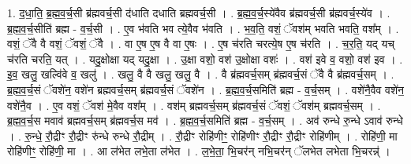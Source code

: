 \documentclass[17pt]{extarticle}
\begin{document}
1. द॒धा॒ति॒ ब्र॒ह्म॒व॒र्च॒सी ब्र॑ह्मवर्च॒सी द॑धाति दधाति ब्रह्मवर्च॒सी । . ब्र॒ह्म॒व॒र्च॒स्ये॑वैव ब्र॑ह्मवर्च॒सी ब्र॑ह्मवर्च॒स्ये॑व । . ब्र॒ह्म॒व॒र्च॒सीति॑ ब्रह्म - व॒र्च॒सी । . ए॒व भ॑वति भव त्ये॒वैव भ॑वति । . भ॒व॒ति॒ वशं॒ ॅवश॑म् भवति भवति॒ वश᳚म् । . वशं॒ ॅवै वै वशं॒ ॅवशं॒ ॅवै । . वा ए॒ष ए॒ष वै वा ए॒षः । . ए॒ष च॑रति चरत्ये॒ष ए॒ष च॑रति । . च॒र॒ति॒ यद् यच् च॑रति चरति॒ यत् । . यदु॒क्षोक्षा यद् यदु॒क्षा । . उ॒क्षा वशो॒ वश॑ उ॒क्षोक्षा वशः॑ । . वश॑ इवे व॒ वशो॒ वश॑ इव । . इ॒व॒ खलु॒ खल्वि॑वे व॒ खलु॑ । . खलु॒ वै वै खलु॒ खलु॒ वै । . वै ब्र॑ह्मवर्च॒सम् ब्र॑ह्मवर्च॒सं ॅवै वै ब्र॑ह्मवर्च॒सम् । . ब्र॒ह्म॒व॒र्च॒सं ॅवशे॑न॒ वशे॑न ब्रह्मवर्च॒सम् ब्र॑ह्मवर्च॒सं ॅवशे॑न । . ब्र॒ह्म॒व॒र्च॒समिति॑ ब्रह्म - व॒र्च॒सम् । . वशे॑नै॒वैव वशे॑न॒ वशे॑नै॒व । . ए॒व वशं॒ ॅवश॑ मे॒वैव वश᳚म् । . वश॑म् ब्रह्मवर्च॒सम् ब्र॑ह्मवर्च॒सं ॅवशं॒ ॅवश॑म् ब्रह्मवर्च॒सम् । . ब्र॒ह्म॒व॒र्च॒स मवाव॑ ब्रह्मवर्च॒सम् ब्र॑ह्मवर्च॒स मव॑ । . ब्र॒ह्म॒व॒र्च॒समिति॑ ब्रह्म - व॒र्च॒सम् । . अव॑ रुन्धे रु॒न्धे ऽवाव॑ रुन्धे । . रु॒न्धे॒ रौ॒द्रीꣳ रौ॒द्रीꣳ रु॑न्धे रुन्धे रौ॒द्रीम् । . रौ॒द्रीꣳ रोहि॑णीꣳ॒॒ रोहि॑णीꣳ रौ॒द्रीꣳ रौ॒द्रीꣳ रोहि॑णीम् । . रोहि॑णी॒ मा रोहि॑णीꣳ॒॒ रोहि॑णी॒ मा । . आ ल॑भेत लभे॒ता ल॑भेत । . ल॒भे॒ता॒ भि॒चर॑न् नभि॒चर॑न् ॅलभेत लभेता भि॒चरन्न्॑ । \newline
\end{document}
